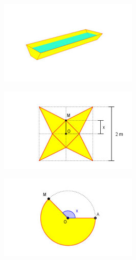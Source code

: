 \begin{figure}
    
    \begin{subfigure}{0.3\textwidth}
    \centering
    \includegraphics[width=.9\textwidth]{icones-modulos/pot-m-pbe.jpg}
    \label{fig:pbe-ic}
    \end{subfigure}
    \hfill
    \begin{subfigure}{0.3\textwidth}
    \centering
    \includegraphics[width=.9\textwidth]{icones-modulos/pot-m-pep.jpg}
    \label{fig:pep-ic}
    \end{subfigure}
    \hfill
    \begin{subfigure}{0.3\textwidth}
    \centering
    \includegraphics[width=.9\textwidth]{icones-modulos/pot-m-pco.jpg}
    \label{fig:pco-ic}
    \end{subfigure}
    

\end{figure}
